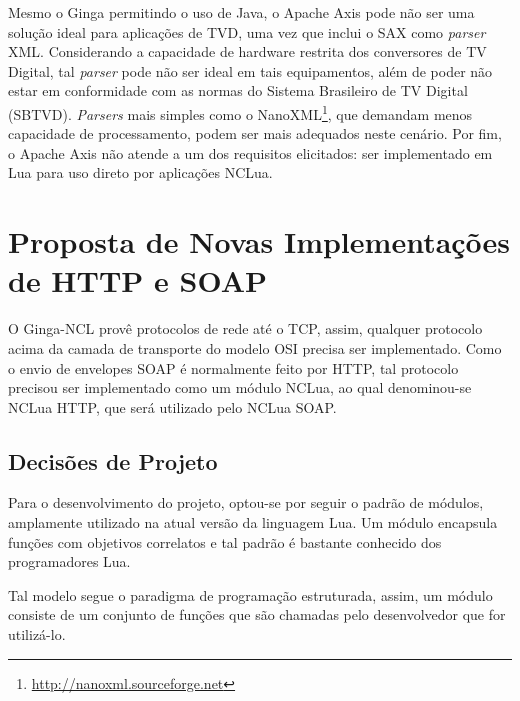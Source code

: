 Mesmo o Ginga permitindo o uso de Java, o Apache Axis pode não ser uma solução ideal para
aplicações de TVD, uma vez que inclui o SAX como \textit{parser} XML.
Considerando a capacidade de hardware restrita dos conversores de TV Digital, tal \textit{parser} pode não ser ideal 
em tais equipamentos, além de poder não estar em conformidade com as normas do 
Sistema Brasileiro de TV Digital (SBTVD). \textit{Parsers} mais simples como o NanoXML\footnote{\url{http://nanoxml.sourceforge.net}}, 
que demandam menos capacidade de processamento, podem ser mais adequados neste cenário.
Por fim, o Apache Axis não atende a um dos requisitos elicitados: ser implementado em Lua para uso direto por aplicações NCLua.

\begin{comment}
\begin{center}
	\texttt{[image: soap-toolkits.png]}
	\captionof{figure}{Tabela comparativa entre \textit{toolkits} SOAP \cite{louridas2006soap}}
	\label{fig:tabela-comparativa}
\end{center}
\end{comment}

\section{Proposta de Novas Implementações de HTTP e SOAP} \label{sec:modulos-implementados}

O Ginga-NCL provê protocolos de rede até o TCP, assim, qualquer protocolo acima da camada de transporte do modelo OSI precisa ser implementado.
Como o envio de envelopes SOAP é normalmente feito por HTTP, tal protocolo precisou ser implementado como um módulo NCLua,
ao qual denominou-se NCLua HTTP, que será utilizado pelo NCLua SOAP.

\subsection{Decisões de Projeto}

Para o desenvolvimento do projeto, optou-se por seguir o padrão
de módulos, amplamente utilizado na atual versão da linguagem Lua.
Um módulo encapsula funções com objetivos correlatos
e tal padrão é bastante conhecido dos programadores Lua.

Tal modelo segue o paradigma de programação estruturada, assim,
um módulo consiste de um conjunto de funções que são chamadas
pelo desenvolvedor que for utilizá-lo.

